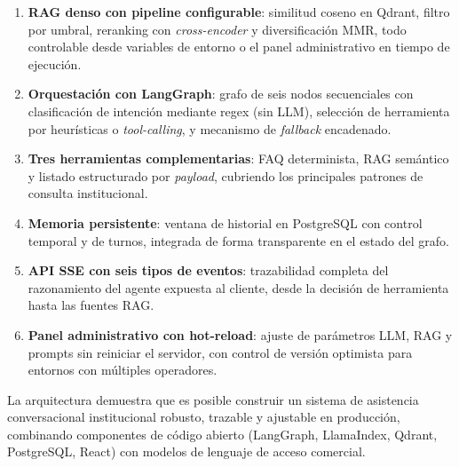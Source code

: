 \documentclass[conference]{IEEEtran}
\begin{document}
\begin{enumerate}
    \item \textbf{RAG denso con pipeline configurable}: similitud coseno en
          Qdrant, filtro por umbral, reranking con \textit{cross-encoder} y
          diversificación MMR, todo controlable desde variables de entorno o
          el panel administrativo en tiempo de ejecución.
    \item \textbf{Orquestación con LangGraph}: grafo de seis nodos secuenciales
          con clasificación de intención mediante regex (sin LLM), selección
          de herramienta por heurísticas o \textit{tool-calling}, y mecanismo
          de \textit{fallback} encadenado.
    \item \textbf{Tres herramientas complementarias}: FAQ determinista, RAG
          semántico y listado estructurado por \textit{payload}, cubriendo
          los principales patrones de consulta institucional.
    \item \textbf{Memoria persistente}: ventana de historial en PostgreSQL
          con control temporal y de turnos, integrada de forma transparente
          en el estado del grafo.
    \item \textbf{API SSE con seis tipos de eventos}: trazabilidad completa del
          razonamiento del agente expuesta al cliente, desde la decisión de
          herramienta hasta las fuentes RAG.
    \item \textbf{Panel administrativo con hot-reload}: ajuste de parámetros
          LLM, RAG y prompts sin reiniciar el servidor, con control de
          versión optimista para entornos con múltiples operadores.
\end{enumerate}

La arquitectura demuestra que es posible construir un sistema de asistencia
conversacional institucional robusto, trazable y ajustable en producción,
combinando componentes de código abierto (LangGraph, LlamaIndex, Qdrant,
PostgreSQL, React) con modelos de lenguaje de acceso comercial.
\end{document}
